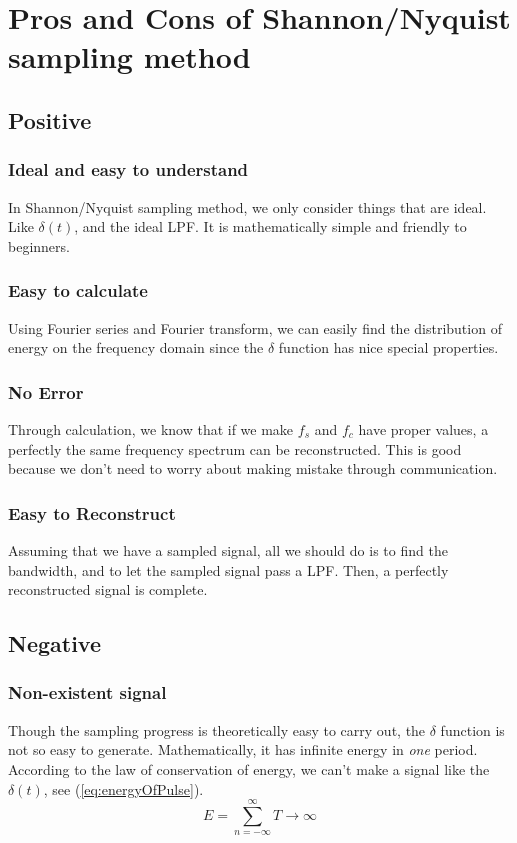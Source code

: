 \documentclass{article}
\begin{document}
\section{Pros and Cons of Shannon/Nyquist sampling method}
\subsection{Positive}
\subsubsection{Ideal and easy to understand}
In Shannon/Nyquist sampling method, we only consider things that are ideal. Like $\delta(t)$, and the ideal LPF. It is mathematically simple and friendly to beginners.
\subsubsection{Easy to calculate}
Using Fourier series and Fourier transform, we can easily find the distribution of energy on the frequency domain since the $\delta$ function has nice special properties.

\subsubsection{No Error}
Through calculation, we know that if we make $f_s$ and $f_c$ have proper values, a perfectly the same frequency spectrum can be reconstructed. This is good because we don't need to worry about making mistake through communication.

\subsubsection{Easy to Reconstruct}
Assuming that we have a sampled signal, all we should do is to find the bandwidth, and to let the sampled signal pass a LPF. Then, a perfectly reconstructed signal is complete.

\subsection{Negative}
\subsubsection{Non-existent signal}
Though the sampling progress is theoretically easy to carry out, the $\delta$ function is not so easy to generate. Mathematically, it has infinite energy in \emph{one} period. According to the law of conservation of energy, we can't make a signal like the $\delta(t)$, see (\ref{eq:energyOfPulse}).
\begin{equation}
E = \sum_{n = -\infty}^{\infty} T \to \infty
\label{eq:energyOfPulse}
\end{equation}
\end{document}
